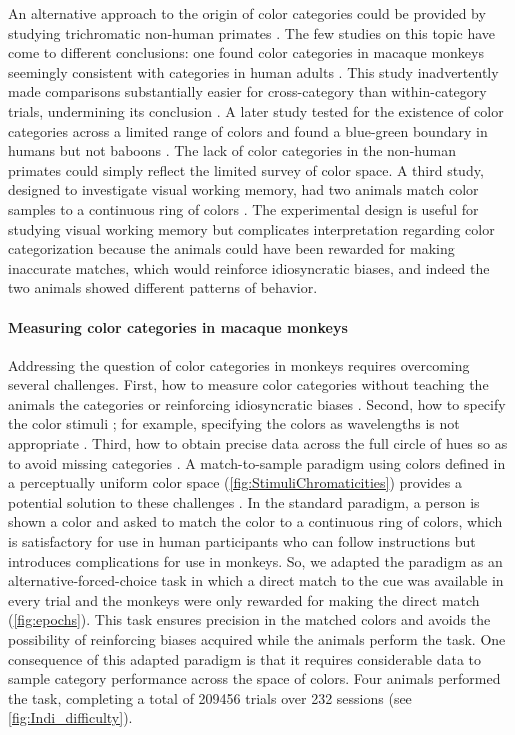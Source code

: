 An alternative approach to the origin of color categories could be provided by studying trichromatic non-human primates \citep{siuda-krzywicka_biological_2019}. 
The few studies on this topic have come to different conclusions: one found color categories in macaque monkeys seemingly consistent with categories in human adults \citep{sandell_color_1979}. 
This study inadvertently made comparisons substantially easier for cross-category than within-category trials, undermining its conclusion \citep{davidoff_cross-species_2010}. 
A later study tested for the existence of color categories across a limited range of colors and found a blue-green boundary in humans but not baboons \citep{fagot_cross-species_2006}.
The lack of color categories in the non-human primates could simply reflect the limited survey of color space. 
A third study, designed to investigate visual working memory, had two animals match color samples to a continuous ring of colors \citep{panichello_error-correcting_2019}. 
The experimental design is useful for studying visual working memory but complicates interpretation regarding color categorization because the animals could have been rewarded for making inaccurate matches, which would reinforce idiosyncratic biases, and indeed the two animals showed different patterns of behavior.

\paragraph{Measuring color categories in macaque monkeys}

Addressing the question of color categories in monkeys requires overcoming several challenges. 
First, how to measure color categories without teaching the animals the categories or reinforcing idiosyncratic biases \citep{essock_color_1977,matsuno_color_2004}.
Second, how to specify the color stimuli \citep{siuda-krzywicka_biological_2019}; for example, specifying the colors as wavelengths \citep{sandell_color_1979}
is not appropriate \citep{davidoff_cross-species_2010}. 
Third, how to obtain precise data across the full circle of hues so as to avoid missing categories \citep{fagot_cross-species_2006}.
A match-to-sample paradigm using colors defined in a perceptually uniform color space (\autoref{fig:StimuliChromaticities}) provides a potential solution to these challenges \citep{bae_why_2015}.
In the standard paradigm, a person is shown a color and asked to match the color to a continuous ring of colors, which is satisfactory for use in human participants who can follow instructions but introduces complications for use in monkeys.
So, we adapted the paradigm as an alternative-forced-choice task in which a direct match to the cue was available in every trial and the monkeys were only rewarded for making the direct match (\autoref{fig:epochs}). 
This task ensures precision in the matched colors and avoids the possibility of reinforcing biases acquired while the animals perform the task.
One consequence of this adapted paradigm is that it requires considerable data to sample category performance across the space of colors. 
Four animals performed the task, completing a total of 209456 trials over 232 sessions (see \autoref{fig:Indi_difficulty}).

